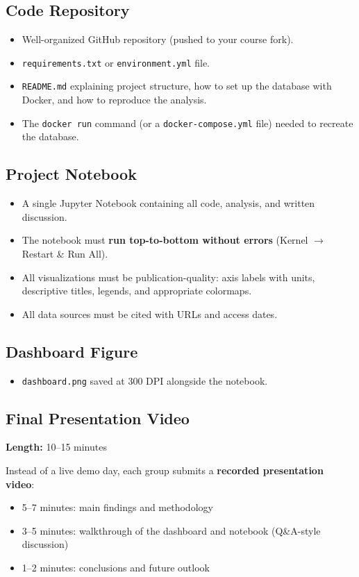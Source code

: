 \documentclass[11pt]{article}
\begin{document}
\subsection{Code Repository}
\begin{itemize}
  \item Well-organized GitHub repository (pushed to your course fork).
  \item \texttt{requirements.txt} or \texttt{environment.yml} file.
  \item \texttt{README.md} explaining project structure, how to set up the database with Docker, and how to reproduce the analysis.
  \item The \texttt{docker run} command (or a \texttt{docker-compose.yml} file) needed to recreate the database.
\end{itemize}

\subsection{Project Notebook}
\begin{itemize}
  \item A single Jupyter Notebook containing all code, analysis, and written discussion.
  \item The notebook must \textbf{run top-to-bottom without errors} (Kernel $\rightarrow$ Restart \& Run All).
  \item All visualizations must be publication-quality: axis labels with units, descriptive titles, legends, and appropriate colormaps.
  \item All data sources must be cited with URLs and access dates.
\end{itemize}

\subsection{Dashboard Figure}
\begin{itemize}
  \item \texttt{dashboard.png} saved at 300 DPI alongside the notebook.
\end{itemize}

\subsection{Final Presentation Video}
\noindent\textbf{Length:} 10--15 minutes

\smallskip
Instead of a live demo day, each group submits a \textbf{recorded presentation video}:
\begin{itemize}
  \item 5--7 minutes: main findings and methodology
  \item 3--5 minutes: walkthrough of the dashboard and notebook (Q\&A-style discussion)
  \item 1--2 minutes: conclusions and future outlook
\end{itemize}
\end{document}
